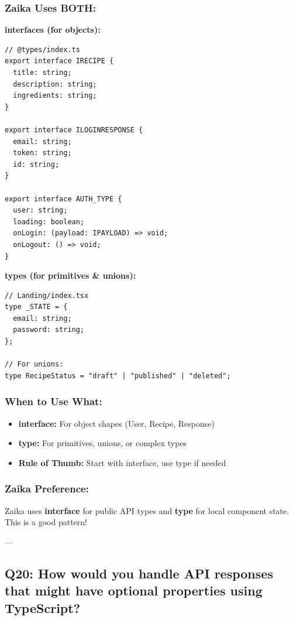 \documentclass[12pt]{article}
\begin{document}
\subsubsection*{Zaika Uses BOTH:}

\textbf{interfaces (for objects):}

\begin{lstlisting}
// @types/index.ts
export interface IRECIPE {
  title: string;
  description: string;
  ingredients: string;
}

export interface ILOGINRESPONSE {
  email: string;
  token: string;
  id: string;
}

export interface AUTH_TYPE {
  user: string;
  loading: boolean;
  onLogin: (payload: IPAYLOAD) => void;
  onLogout: () => void;
}
\end{lstlisting}

\textbf{types (for primitives \& unions):}

\begin{lstlisting}
// Landing/index.tsx
type _STATE = {
  email: string;
  password: string;
};

// For unions:
type RecipeStatus = "draft" | "published" | "deleted";
\end{lstlisting}

\subsubsection*{When to Use What:}

\begin{itemize}
    \item \textbf{interface:} For object shapes (User, Recipe, Response)
    \item \textbf{type:} For primitives, unions, or complex types
    \item \textbf{Rule of Thumb:} Start with interface, use type if needed
\end{itemize}

\subsubsection*{Zaika Preference:}

Zaika uses \textbf{interface} for public API types and \textbf{type} for local component state. This is a good pattern!

---

\subsection{Q20: How would you handle API responses that might have optional properties using TypeScript?}
\end{document}
